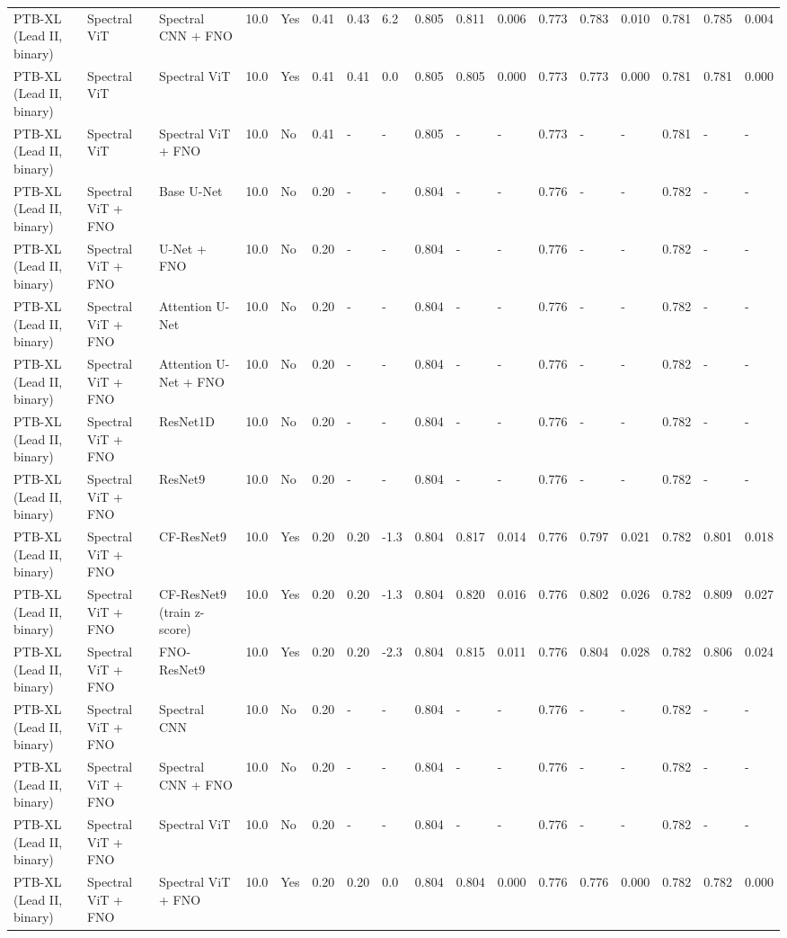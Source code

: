 \begin{longtable}{lllllllllllllllll}
PTB-XL (Lead II, binary) & Spectral ViT & Spectral CNN + FNO & 10.0 & Yes & 0.41 & 0.43 & 6.2 & 0.805 & 0.811 & 0.006 & 0.773 & 0.783 & 0.010 & 0.781 & 0.785 & 0.004 \\
PTB-XL (Lead II, binary) & Spectral ViT & Spectral ViT & 10.0 & Yes & 0.41 & 0.41 & 0.0 & 0.805 & 0.805 & 0.000 & 0.773 & 0.773 & 0.000 & 0.781 & 0.781 & 0.000 \\
PTB-XL (Lead II, binary) & Spectral ViT & Spectral ViT + FNO & 10.0 & No & 0.41 & - & - & 0.805 & - & - & 0.773 & - & - & 0.781 & - & - \\
PTB-XL (Lead II, binary) & Spectral ViT + FNO & Base U-Net & 10.0 & No & 0.20 & - & - & 0.804 & - & - & 0.776 & - & - & 0.782 & - & - \\
PTB-XL (Lead II, binary) & Spectral ViT + FNO & U-Net + FNO & 10.0 & No & 0.20 & - & - & 0.804 & - & - & 0.776 & - & - & 0.782 & - & - \\
PTB-XL (Lead II, binary) & Spectral ViT + FNO & Attention U-Net & 10.0 & No & 0.20 & - & - & 0.804 & - & - & 0.776 & - & - & 0.782 & - & - \\
PTB-XL (Lead II, binary) & Spectral ViT + FNO & Attention U-Net + FNO & 10.0 & No & 0.20 & - & - & 0.804 & - & - & 0.776 & - & - & 0.782 & - & - \\
PTB-XL (Lead II, binary) & Spectral ViT + FNO & ResNet1D & 10.0 & No & 0.20 & - & - & 0.804 & - & - & 0.776 & - & - & 0.782 & - & - \\
PTB-XL (Lead II, binary) & Spectral ViT + FNO & ResNet9 & 10.0 & No & 0.20 & - & - & 0.804 & - & - & 0.776 & - & - & 0.782 & - & - \\
PTB-XL (Lead II, binary) & Spectral ViT + FNO & CF-ResNet9 & 10.0 & Yes & 0.20 & 0.20 & -1.3 & 0.804 & 0.817 & 0.014 & 0.776 & 0.797 & 0.021 & 0.782 & 0.801 & 0.018 \\
PTB-XL (Lead II, binary) & Spectral ViT + FNO & CF-ResNet9 (train z-score) & 10.0 & Yes & 0.20 & 0.20 & -1.3 & 0.804 & 0.820 & 0.016 & 0.776 & 0.802 & 0.026 & 0.782 & 0.809 & 0.027 \\
PTB-XL (Lead II, binary) & Spectral ViT + FNO & FNO-ResNet9 & 10.0 & Yes & 0.20 & 0.20 & -2.3 & 0.804 & 0.815 & 0.011 & 0.776 & 0.804 & 0.028 & 0.782 & 0.806 & 0.024 \\
PTB-XL (Lead II, binary) & Spectral ViT + FNO & Spectral CNN & 10.0 & No & 0.20 & - & - & 0.804 & - & - & 0.776 & - & - & 0.782 & - & - \\
PTB-XL (Lead II, binary) & Spectral ViT + FNO & Spectral CNN + FNO & 10.0 & No & 0.20 & - & - & 0.804 & - & - & 0.776 & - & - & 0.782 & - & - \\
PTB-XL (Lead II, binary) & Spectral ViT + FNO & Spectral ViT & 10.0 & No & 0.20 & - & - & 0.804 & - & - & 0.776 & - & - & 0.782 & - & - \\
PTB-XL (Lead II, binary) & Spectral ViT + FNO & Spectral ViT + FNO & 10.0 & Yes & 0.20 & 0.20 & 0.0 & 0.804 & 0.804 & 0.000 & 0.776 & 0.776 & 0.000 & 0.782 & 0.782 & 0.000 \\
\end{longtable}
